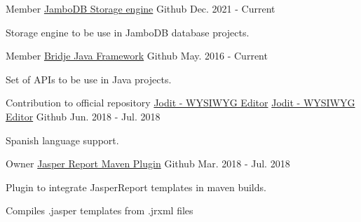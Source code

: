 
\begin{cventries}

  \cventry
    {Member} %
    {\href{https://github.com/jambodb/jambodb-storage}{JamboDB Storage engine}} %
    {\faGithubSquare\acvHeaderIconSep Github} %
    {Dec. 2021 - Current} %
    {
      \begin{cvitems} %
        \item {Storage engine to be use in JamboDB database projects.}
      \end{cvitems}
    }

  \cventry
    {Member} %
    {\href{https://github.com/touwolf/bridje-framework}{Bridje Java Framework}} %
    {\faGithubSquare\acvHeaderIconSep Github} %
    {May. 2016 - Current} %
    {
      \begin{cvitems} %
        \item {Set of APIs to be use in Java projects.}
      \end{cvitems}
    }

  \cventry
    {Contribution to official repository \href{https://github.com/xdan/jodit}{Jodit - WYSIWYG Editor}} %
    {\href{https://github.com/miche-atucha/jodit}{Jodit - WYSIWYG Editor}} %
    {\faGithubSquare\acvHeaderIconSep Github} %
    {Jun. 2018 - Jul. 2018} %
    {
      \begin{cvitems} %
        \item {Spanish language support.}
      \end{cvitems}
    }

  \cventry
    {Owner} %
    {\href{https://github.com/miche-atucha/jasperreport-maven-plugin}{Jasper Report Maven Plugin}} %
    {\faGithubSquare\acvHeaderIconSep Github} %
    {Mar. 2018 - Jul. 2018} %
    {
      \begin{cvitems} %
        \item {Plugin to integrate JasperReport templates in maven builds.}
        \item {Compiles .jasper templates from .jrxml files}
      \end{cvitems}
    }


\end{cventries}

